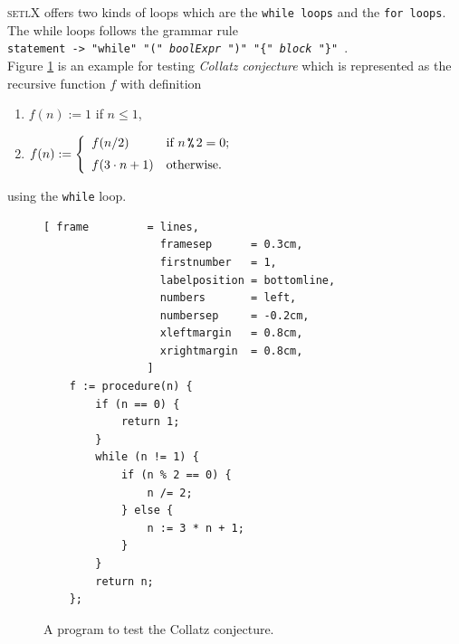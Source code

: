 \documentclass[11pt]{report}
\begin{document}
\textsc{setlX} offers two kinds of loops which are the \texttt{while loops} and the \texttt{for loops}. The while loops follows the grammar rule
\\[0.2cm]
\hspace*{1.3cm}
\texttt{statement -> "while" "(" \textsl{boolExpr} ")" "\{" \textsl{block} "\}" }.
\\[0.2cm]
Figure \ref{fig:ulam.stlx} is an example for testing \emph{Collatz conjecture}\cite{CollatzConjecture:Online} which is represented as the recursive function $f$ with definition
\begin{enumerate}
\item $f(n) := 1$ \hspace*{2.13cm} if $n \leq 1$,
\item $f(n) := \left\{
       \begin{array}[c]{ll}
         f(n/2)           & \mbox{if $n \,\texttt{\symbol{37}}\, 2 = 0$;} \\[0.2cm]  
         f(3 \cdot n + 1) & \mbox{otherwise.} 
       \end{array}
       \right.
      $ 
\end{enumerate}
using the \texttt{while} loop.
\begin{figure}[!ht]
\centering
\begin{Verbatim}[ frame         = lines, 
                  framesep      = 0.3cm, 
                  firstnumber   = 1,
                  labelposition = bottomline,
                  numbers       = left,
                  numbersep     = -0.2cm,
                  xleftmargin   = 0.8cm,
                  xrightmargin  = 0.8cm,
                ]
    f := procedure(n) {
        if (n == 0) {
            return 1;   
        }
        while (n != 1) {
            if (n % 2 == 0) {
                n /= 2;
            } else {
                n := 3 * n + 1;
            }
        }
        return n;
    };
\end{Verbatim}
\vspace*{-0.3cm}
\caption{A program to test the Collatz conjecture.}
\label{fig:ulam.stlx}
\end{figure}
\end{document}
